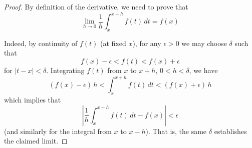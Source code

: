 

\begin{proof}
By definition of the derivative, we need to prove that 
$$
\lim_{h\to 0} \frac{1}{h}\int_x^{x+h} f(t)\,dt = f(x)
$$

Indeed, by continuity of $f(t)$ (at fixed $x$), for 
any $\epsilon>0$ we may choose $\delta$ such that
$$
f(x)-\epsilon<f(t)<f(x)+\epsilon
$$
for $|t-x|<\delta$. Integrating $f(t)$ from $x$ to $x+h$, $0<h<\delta$, we have
$$
(f(x)-\epsilon)\, h < \int_x^{x+h} f(t)\,dt < (f(x)+\epsilon)\, h
$$
which implies that
$$
\left| \frac{1}{h}\int_x^{x+h} f(t)\,dt - f(x) \right| < \epsilon
$$
(and similarly for the integral from $x$ to $x-h$). That is, the same 
$\delta$ establishes the claimed limit.

\end{proof}

